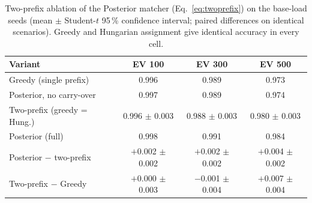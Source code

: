 \documentclass{ieeeaccess}
\newif\ifhighlight \highlightfalse
\DeclareRobustCommand{\revised}[1]{\ifhighlight{\color{blue}#1}\else{\color{.}#1}\fi}
\begin{document}
    \begin{table}[htbp]
        \caption{\revised{Two-prefix ablation of the Posterior matcher (Eq.~\eqref{eq:twoprefix}) on the base-load seeds (mean $\pm$ Student-$t$ 95\,\% confidence interval; paired differences on identical scenarios). Greedy and Hungarian assignment give identical accuracy in every cell.}}
        \label{table:twoprefix}
        \centering
        \scriptsize
        \setlength{\tabcolsep}{2pt}
        \revised{\begin{tabular}{@{}l@{\hspace{4pt}}ccc@{}}
            \toprule
            \textbf{Variant} & \textbf{EV 100} & \textbf{EV 300} & \textbf{EV 500} \\
            \midrule
            Greedy (single prefix) & 0.996 & 0.989 & 0.973 \\
            Posterior, no carry-over & 0.997 & 0.989 & 0.974 \\
            Two-prefix (greedy = Hung.) & 0.996 $\pm$ 0.003 & 0.988 $\pm$ 0.003 & 0.980 $\pm$ 0.003 \\
            Posterior (full) & 0.998 & 0.991 & 0.984 \\
            \midrule
            Posterior $-$ two-prefix & $+$0.002 $\pm$ 0.002 & $+$0.002 $\pm$ 0.002 & $+$0.004 $\pm$ 0.002 \\
            Two-prefix $-$ Greedy & $+$0.000 $\pm$ 0.003 & $-$0.001 $\pm$ 0.004 & $+$0.007 $\pm$ 0.004 \\
            \bottomrule
        \end{tabular}}
    \end{table}
\end{document}

